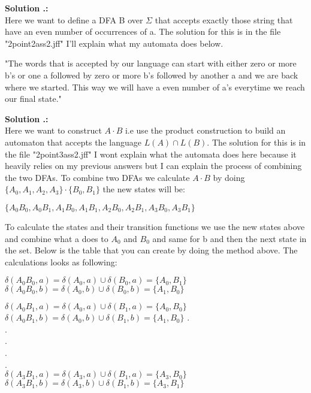 \documentclass{article}
\newcounter{problem}
\newcounter{solution}
\newcommand\ASolution{%
  \stepcounter{solution}%
  \textbf{Solution \theproblem.\thesolution:}\\%
}
\begin{document}
\ASolution Here we want to define a DFA B over $\Sigma$ that 
accepts exactly those string that have an even number of 
occurrences of a. The solution for this is in the file 
"2point2ass2.jff" I'll explain what my automata does below.

\begin{center}
    "The words that is accepted by our language can start with 
    either zero or more b's or one a followed by zero or more 
    b's followed by another a and we are back where we started.
    This way we will have a even number of a's everytime we reach
    our final state." 
\end{center}
\newpage
\ASolution Here we want to construct $A \cdot B$ i.e use the product construction to 
build an automaton that accepts the language $L(A) \cap L(B)$. The solution for this 
is in the file "2point3ass2.jff" I wont explain what the automata does here because 
it heavily relies on my previous answers but I can explain the process of combining 
the two DFAs. To combine two DFAs we calculate $A \cdot B$ by doing 
$\{A_0,A_1,A_2,A_3\} \cdot \{B_0,B_1\}$ the new states will be:
\begin{center}
    $\{A_0B_0,A_0B_1,A_1B_0,A_1B_1,A_2B_0,A_2B_1,A_3B_0,A_3B_1\}$
\end{center}

To calculate the states and their transition functions we use the new states 
above and combine what a does to $A_0$ and $B_0$ and same for b and then the 
next state in the set. Below is the table that you can create by doing the 
method above. The calculations looks as following:

$\delta (A_0B_0, a) = \delta (A_0, a) \cup \delta (B_0, a) = \{A_0, B_1\}$ \newline
$\delta (A_0B_0, b) = \delta (A_0, b) \cup \delta (B_0, b) = \{A_1, B_0\}$

$\delta (A_0B_1, a) = \delta (A_0, a) \cup \delta (B_1, a) = \{A_0, B_0\}$ \newline
$\delta (A_0B_1, b) = \delta (A_0, b) \cup \delta (B_1, b) = \{A_1, B_0\}$
\hfill
. \\
. \\
. \\
. \\
. \\
$\delta (A_3B_1, a) = \delta (A_3, a) \cup \delta (B_1, a) = \{A_3, B_0\}$ \newline
$\delta (A_3B_1, b) = \delta (A_3, b) \cup \delta (B_1, b) = \{A_3, B_1\}$ \newline
\end{document}
